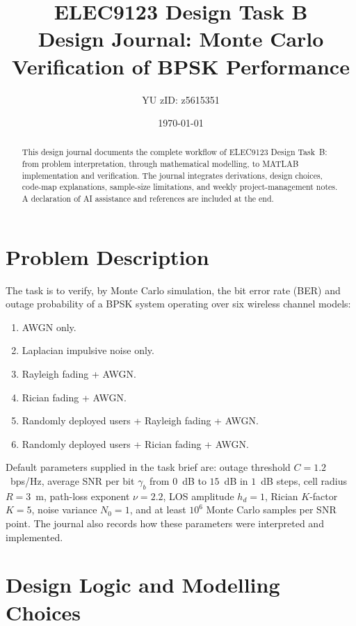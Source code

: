 \documentclass[12pt,a4paper]{article}
\title{\textbf{ELEC9123 Design Task B}\\[0.3em]
\large Design Journal: Monte Carlo Verification of BPSK Performance}
\author{YU \quad zID: z5615351}
\date{\today}
\begin{document}
\maketitle

\begin{abstract}
This design journal documents the complete workflow of ELEC9123 Design Task~B: from problem interpretation, through mathematical modelling, to MATLAB implementation and verification. The journal integrates derivations, design choices, code-map explanations, sample-size limitations, and weekly project-management notes. A declaration of AI assistance and references are included at the end.
\end{abstract}

\tableofcontents
\newpage

\section{Problem Description}\label{sec:problem}
The task is to verify, by Monte Carlo simulation, the bit error rate (BER) and outage probability of a BPSK system operating over six wireless channel models:
\begin{enumerate}[label=\arabic*.]
    \item AWGN only.
    \item Laplacian impulsive noise only.
    \item Rayleigh fading + AWGN.
    \item Rician fading + AWGN.
    \item Randomly deployed users + Rayleigh fading + AWGN.
    \item Randomly deployed users + Rician fading + AWGN.
\end{enumerate}

Default parameters supplied in the task brief are: outage threshold $C=1.2$~bps/Hz, average SNR per bit $\gamma_b$ from $0$~dB to $15$~dB in $1$~dB steps, cell radius $R=3$~m, path-loss exponent $\nu=2.2$, LOS amplitude $h_d=1$, Rician $K$-factor $K=5$, noise variance $N_0=1$, and at least $10^6$ Monte Carlo samples per SNR point. The journal also records how these parameters were interpreted and implemented.

\section{Design Logic and Modelling Choices}\label{sec:logic}
\end{document}
